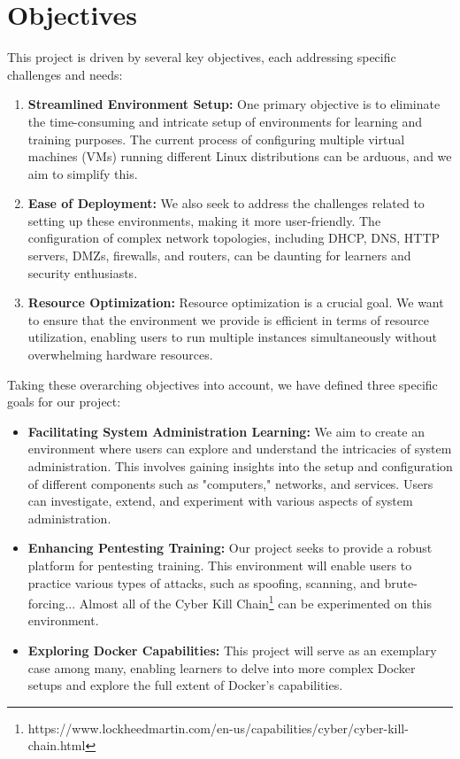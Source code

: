 \documentclass[a4paper,10pt]{article}
\begin{document}
\section{Objectives}
This project is driven by several key objectives, each addressing specific challenges and needs:

\begin{enumerate}
    \item \textbf{Streamlined Environment Setup:} One primary objective is to eliminate the time-consuming and intricate setup of environments for learning and training purposes. The current process of configuring multiple virtual machines (VMs) running different Linux distributions can be arduous, and we aim to simplify this.
    
    \item \textbf{Ease of Deployment:} We also seek to address the challenges related to setting up these environments, making it more user-friendly. The configuration of complex network topologies, including DHCP, DNS, HTTP servers, DMZs, firewalls, and routers, can be daunting for learners and security enthusiasts.
    
    \item \textbf{Resource Optimization:} Resource optimization is a crucial goal. We want to ensure that the environment we provide is efficient in terms of resource utilization, enabling users to run multiple instances simultaneously without overwhelming hardware resources.
\end{enumerate}

Taking these overarching objectives into account, we have defined three specific goals for our project:

\begin{itemize}
    \item \textbf{Facilitating System Administration Learning:} We aim to create an environment where users can explore and understand the intricacies of system administration. This involves gaining insights into the setup and configuration of different components such as "computers," networks, and services. Users can investigate, extend, and experiment with various aspects of system administration.

    \item \textbf{Enhancing Pentesting Training:} Our project seeks to provide a robust platform for pentesting training. This environment will enable users to practice various types of attacks, such as spoofing, scanning, and brute-forcing... Almost all of the Cyber Kill Chain\footnote{https://www.lockheedmartin.com/en-us/capabilities/cyber/cyber-kill-chain.html} can be experimented on this environment.

    \item \textbf{Exploring Docker Capabilities:} This project will serve as an exemplary case among many, enabling learners to delve into more complex Docker setups and explore the full extent of Docker's capabilities.

\end{itemize}
\end{document}
